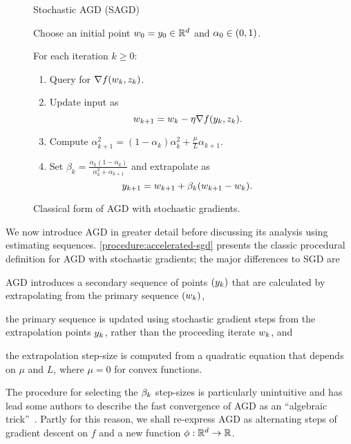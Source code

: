 \begin{figure}[t]
    \centering
    \begin{procedure}{Stochastic \ac{AGD} (\ac{SAGD})}
    \item Choose an initial point \( w_0 = y_0 \in \mathbb{R}^d \) and \( \alpha_0 \in \left(0,1\right) \).
        \item For each iteration \( k \geq 0 \):
            \begin{enumerate}
                \item Query \oracle{} for \( \nabla f(w_k, z_{k}) \). 
                \item Update input as\vspace{-1ex}%
                \[ w_{k+1} = w_k - \eta \nabla f(y_k, z_{k}). \]
                \item Compute 
                    \( \alpha_{k+1}^2 = (1 - \alpha_k)\alpha_k^2 + \frac{\mu}{L} \alpha_{k+1} \).
                \item Set \( \beta_{k} = \frac{\alpha_k (1-\alpha_k)}{\alpha_k^2 + \alpha_{k+1}} \) and extrapolate as
                    \[ y_{k+1} = w_{k+1} + \beta_k (w_{k+1} - w_k).  \] 
            \end{enumerate}
    \end{procedure}
    \caption[Classic procedural definition of Nesterov's accelerated gradient descent algorithm.]%
        {Classical form of \ac{AGD} with stochastic gradients.}%
    \label{procedure:accelerated-sgd}
\end{figure} 

We now introduce \ac{AGD} in greater detail before discussing its analysis using estimating sequences. 
\autoref{procedure:accelerated-sgd} presents the classic procedural definition for \ac{AGD} with stochastic gradients; the major differences to \ac{SGD} are
\begin{inparaenum}[(i)]
\item \ac{AGD} introduces a secondary sequence of points \( \left(y_k\right) \) that are calculated by extrapolating from the primary sequence \( \left(w_k\right) \),
\item the primary sequence is updated using stochastic gradient steps from the extrapolation points \( y_k \), rather than the proceeding iterate \( w_k \), and 
\item the extrapolation step-size is computed from a quadratic equation that depends on \( \mu \) and \( L \), where \( \mu = 0 \) for convex functions. 
\end{inparaenum}
The procedure for selecting the \( \beta_{k} \) step-sizes is particularly unintuitive and has lead some authors to describe the fast convergence of \ac{AGD} as an ``algebraic trick''~\citep{allen2014linear}.
Partly for this reason, we shall re-express \ac{AGD} as alternating steps of gradient descent on \( f \) and a new function \( \phi : \mathbb{R}^d \rightarrow \mathbb{R} \).


